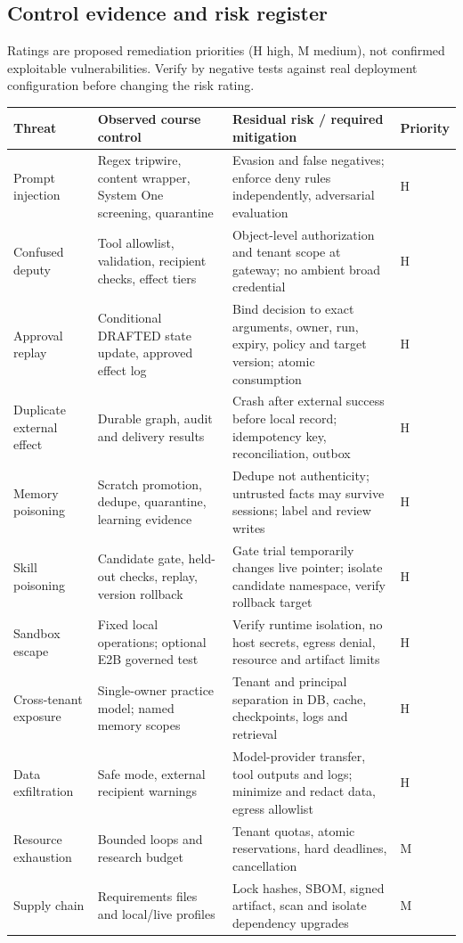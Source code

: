 \documentclass[11pt,letterpaper]{article}
\begin{document}
\subsection{Control evidence and risk register}
Ratings are proposed remediation priorities (H high, M medium), not confirmed exploitable vulnerabilities. Verify by negative tests against real deployment configuration before changing the risk rating.
\begin{longtable}{>{\raggedright\arraybackslash}p{.18\linewidth}>{\raggedright\arraybackslash}p{.28\linewidth}>{\raggedright\arraybackslash}p{.30\linewidth}>{\raggedright\arraybackslash}p{.13\linewidth}}\toprule
Threat & Observed course control & Residual risk / required mitigation & Priority \\\midrule\endhead
Prompt injection & Regex tripwire, content wrapper, System One screening, quarantine & Evasion and false negatives; enforce deny rules independently, adversarial evaluation & H \\
Confused deputy & Tool allowlist, validation, recipient checks, effect tiers & Object-level authorization and tenant scope at gateway; no ambient broad credential & H \\
Approval replay & Conditional DRAFTED state update, approved effect log & Bind decision to exact arguments, owner, run, expiry, policy and target version; atomic consumption & H \\
Duplicate external effect & Durable graph, audit and delivery results & Crash after external success before local record; idempotency key, reconciliation, outbox & H \\
Memory poisoning & Scratch promotion, dedupe, quarantine, learning evidence & Dedupe not authenticity; untrusted facts may survive sessions; label and review writes & H \\
Skill poisoning & Candidate gate, held-out checks, replay, version rollback & Gate trial temporarily changes live pointer; isolate candidate namespace, verify rollback target & H \\
Sandbox escape & Fixed local operations; optional E2B governed test & Verify runtime isolation, no host secrets, egress denial, resource and artifact limits & H \\
Cross-tenant exposure & Single-owner practice model; named memory scopes & Tenant and principal separation in DB, cache, checkpoints, logs and retrieval & H \\
Data exfiltration & Safe mode, external recipient warnings & Model-provider transfer, tool outputs and logs; minimize and redact data, egress allowlist & H \\
Resource exhaustion & Bounded loops and research budget & Tenant quotas, atomic reservations, hard deadlines, cancellation & M \\
Supply chain & Requirements files and local/live profiles & Lock hashes, SBOM, signed artifact, scan and isolate dependency upgrades & M \\
\bottomrule\end{longtable}
\end{document}
